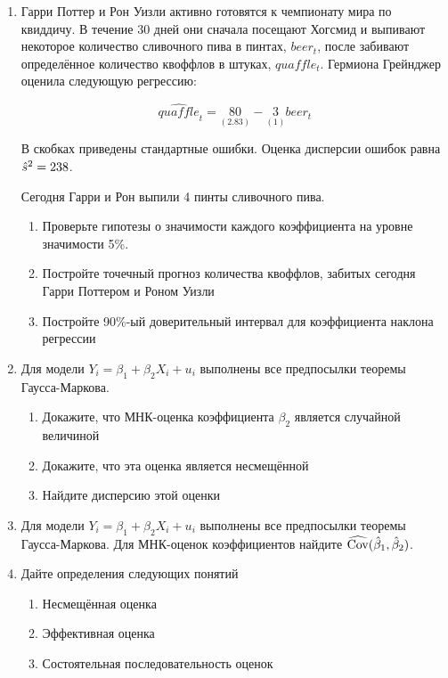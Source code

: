 \documentclass[12pt, a4paper]{article}
\begin{document}
\begin{enumerate}
\item Гарри Поттер и Рон Уизли активно готовятся к чемпионату мира по квиддичу. В течение 30 дней они сначала посещают Хогсмид и выпивают некоторое количество сливочного пива в пинтах, $beer_t$, после забивают определённое количество квоффлов в штуках, $quaffle_t$. Гермиона Грейнджер оценила следующую регрессию:

\[
\widehat{quaffle}_t = \underset{(2.83)}{80} - \underset{(1)}{3} beer_t
\]

В скобках приведены стандартные ошибки. Оценка дисперсии ошибок равна $\hat{s}^2 = 238$.

Сегодня Гарри и Рон выпили 4 пинты сливочного пива.

\begin{enumerate}
\item Проверьте гипотезы о значимости каждого коэффициента на уровне значимости 5\%.
\item Постройте точечный прогноз количества квоффлов, забитых сегодня Гарри Поттером и Роном Уизли
\item Постройте 90\%-ый доверительный интервал для коэффициента наклона регрессии
\end{enumerate}



\item Для модели $Y_i = \beta_1 + \beta_2 X_i + u_i$ выполнены все предпосылки теоремы Гаусса-Маркова.
\begin{enumerate}
\item Докажите, что МНК-оценка коэффициента $\beta_2$ является случайной величиной
\item Докажите, что эта оценка является несмещённой
\item Найдите дисперсию этой оценки
\end{enumerate}



\item Для модели $Y_i = \beta_1 + \beta_2 X_i + u_i$ выполнены все предпосылки теоремы Гаусса-Маркова. Для МНК-оценок коэффициентов найдите $\widehat{\operatorname{Cov}}(\hat{\beta}_1, \hat{\beta}_2)$.


\item Дайте определения следующих понятий
\begin{enumerate}
\item Несмещённая оценка
\item Эффективная оценка
\item Состоятельная последовательность оценок
\end{enumerate}



\end{enumerate}
\end{document}
